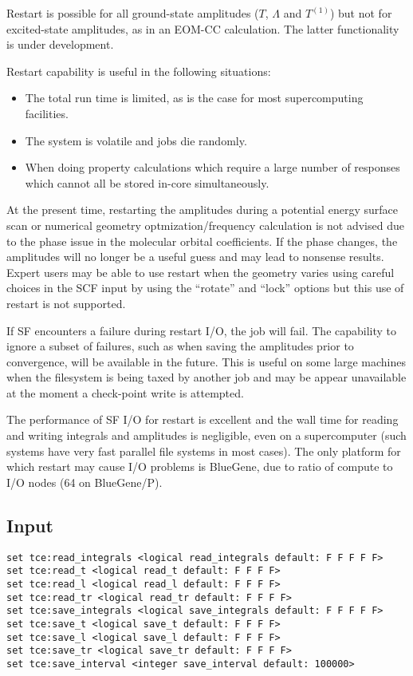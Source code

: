 Restart is possible for all ground-state amplitudes ($T$, $\Lambda$ and $T^{(1)}$) but not for excited-state amplitudes, as in an EOM-CC calculation.  The latter functionality is under development.

Restart capability is useful in the following situations:
\begin{itemize}
 \item The total run time is limited, as is the case for most supercomputing facilities.
 \item The system is volatile and jobs die randomly.
 \item When doing property calculations which require a large number of responses which cannot all be stored in-core simultaneously.
\end{itemize}

At the present time, restarting the amplitudes during a potential energy surface scan or numerical geometry optmization/frequency calculation is not advised due to the phase issue in the molecular orbital coefficients.  If the phase changes, the amplitudes will no longer be a useful guess and may lead to nonsense results.  Expert users may be able to use restart when the geometry varies using careful choices in the SCF input by using the ``rotate'' and ``lock'' options but this use of restart is not supported.

If SF encounters a failure during restart I/O, the job will fail.  The capability to ignore a subset of failures, such as when saving the amplitudes prior to convergence, will be available in the future.  This is useful on some large machines when the filesystem is being taxed by another job and may be appear unavailable at the moment a check-point write is attempted.  

The performance of SF I/O for restart is excellent and the wall time for reading and writing integrals and amplitudes is negligible, even on a supercomputer (such systems have very fast parallel file systems in most cases).  The only platform for which restart may cause I/O problems is BlueGene, due to ratio of compute to I/O nodes (64 on BlueGene/P).

\subsection{Input}

\begin{verbatim}
set tce:read_integrals <logical read_integrals default: F F F F F>
set tce:read_t <logical read_t default: F F F F>
set tce:read_l <logical read_l default: F F F F>
set tce:read_tr <logical read_tr default: F F F F>
set tce:save_integrals <logical save_integrals default: F F F F F>
set tce:save_t <logical save_t default: F F F F>
set tce:save_l <logical save_l default: F F F F>
set tce:save_tr <logical save_tr default: F F F F>
set tce:save_interval <integer save_interval default: 100000>
\end{verbatim}

